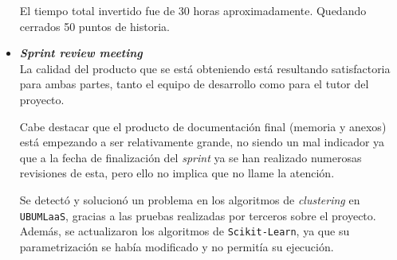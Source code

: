 \begin{itemize}
El tiempo total invertido fue de 30 horas aproximadamente. Quedando cerrados 50 puntos de historia.

\item \textbf{\textit{Sprint review meeting}}\\
La calidad del producto que se está obteniendo está resultando satisfactoria para ambas partes, tanto el equipo de desarrollo como para el tutor del proyecto. 

Cabe destacar que el producto de documentación final (memoria y anexos) está empezando a ser relativamente grande, no siendo un mal indicador ya que a la fecha de finalización del \textit{sprint} ya se han realizado numerosas revisiones de esta, pero ello no implica que no llame la atención.

Se detectó y solucionó un problema en los algoritmos de \textit{clustering} en \texttt{UBUMLaaS}, gracias a las pruebas realizadas por terceros sobre el proyecto. Además, se actualizaron los algoritmos de \texttt{Scikit-Learn}, ya que su parametrización se había modificado y no permitía su ejecución.

\end{itemize}

